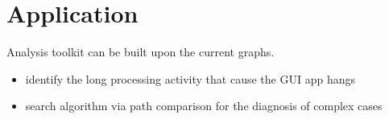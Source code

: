 \section {Application}
Analysis toolkit can be built upon the current graphs.
\begin {itemize}
\item identify the long processing activity that cause the GUI app hangs
\item search algorithm via path comparison for the diagnosis of complex cases
\end {itemize}
